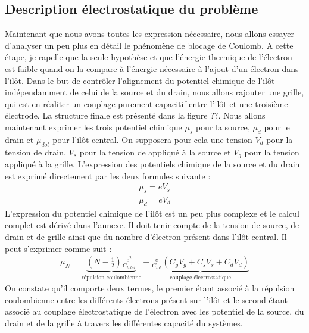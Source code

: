 \subsection{Description électrostatique du problème}
Maintenant que nous avons toutes les expression nécessaire, nous allons essayer d'analyser un peu plus en détail le phénomène de blocage de Coulomb. A cette étape, je rapelle que la seule hypothèse et que l'énergie thermique de l'électron est faible quand on la compare à l'énergie nécessaire à l'ajout d'un électron dans l'il\^ot. Dans le but de contrôler l'alignement du potentiel chimique de l'ilôt indépendamment de celui de la source et du drain, nous allons rajouter une grille, qui est en réaliter un couplage purement capacitif entre l'ilôt et une troisième électrode. La structure finale est présenté dans la figure ??. Nous allons maintenant exprimer les trois potentiel chimique $\mu_s$ pour la source, $\mu_d$ pour le drain et $\mu_{dot}$ pour l'ilôt central. On supposera pour cela une tension $V_{d}$ pour la tension de drain, $V_s$ pour la tension de appliqué à la source et $V_g$ pour la tension appliqué à la grille. L'expression des potentiels chimique de la source et du drain est exprimé directement par les deux formules suivante :
\begin{eqnarray}
\mu_s = eV_s \\
\mu_d = eV_d
\end{eqnarray}
L'expression du potentiel chimique de l'il\^ot est un peu plus complexe et le calcul complet est dérivé dans l'annexe. Il doit tenir compte de la tension de source, de drain et de grille ainsi que du nombre d'électron présent dans l'il\^ot central. Il peut s'exprimer comme suit :
\begin{eqnarray}
\mu_N = 
\underbrace{(N-\frac{1}{2})\frac{e^2}{C_{total}}}_{\text{répulsion coulombienne}}
+ 
\underbrace{\frac{e}{C_{tot}}(C_gV_g + C_sV_s + C_dV_d)}_{\text{couplage électrostatique}}
\end{eqnarray}
On constate qu'il comporte deux termes, le premier étant associé à la répulsion coulombienne entre les différents électrons présent sur l'il\^ot et le second étant associé au couplage électrostatique de l'électron avec les potentiel de la source, du drain et de la grille à travers les différentes capacité du systèmes.


